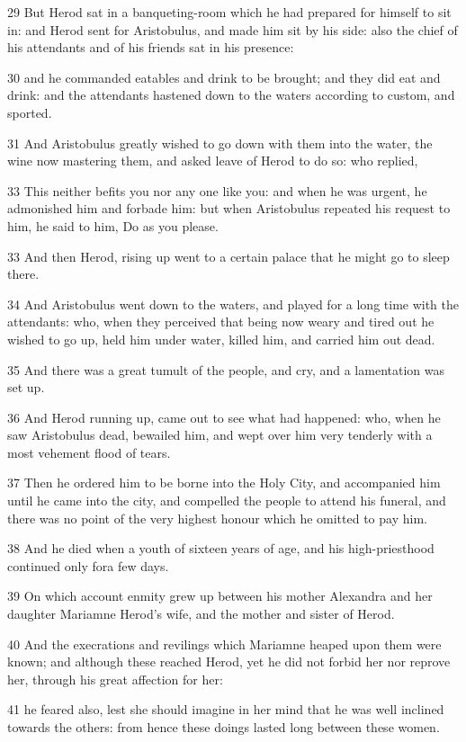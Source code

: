 29 But Herod sat in a banqueting-room which he had prepared for himself to sit in: and Herod sent for Aristobulus, and made him sit by his side: also the chief of his attendants and of his friends sat in his presence: 

30 and he commanded eatables and drink to be brought; and they did eat and drink: and the attendants hastened down to the waters according to custom, and sported. 

31 And Aristobulus greatly wished to go down with them into the water, the wine now mastering them, and asked leave of Herod to do so: who replied, 

33 This neither befits you nor any one like you: and when he was urgent, he admonished him and forbade him: but when Aristobulus repeated his request to him, he said to him, Do as you please. 

33 And then Herod, rising up went to a certain palace that he might go to sleep there. 

34 And Aristobulus went down to the waters, and played for a long time with the attendants: who, when they perceived that being now weary and tired out he wished to go up, held him under water, killed him, and carried him out dead. 

35 And there was a great tumult of the people, and cry, and a lamentation was set up. 

36 And Herod running up, came out to see what had happened: who, when he saw Aristobulus dead, bewailed him, and wept over him very tenderly with a most vehement flood of tears. 

37 Then he ordered him to be borne into the Holy City, and accompanied him until he came into the city, and compelled the people to attend his funeral, and there was no point of the very highest honour which he omitted to pay him. 

38 And he died when a youth of sixteen years of age, and his high-priesthood continued only fora few days. 

39 On which account enmity grew up between his mother Alexandra and her daughter Mariamne Herod’s wife, and the mother and sister of Herod. 

40 And the execrations and revilings which Mariamne heaped upon them were known; and although these reached Herod, yet he did not forbid her nor reprove her, through his great affection for her: 

41 he feared also, lest she should imagine in her mind that he was well inclined towards the others: from hence these doings lasted long between these women. 

